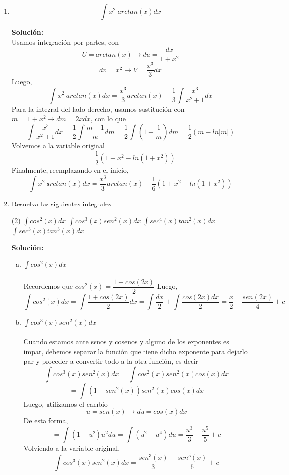 \documentclass[12pt]{article}
\newenvironment{solucion}
{\begin{mdframed}[backgroundcolor=black!10]
		{\bf Solución:}\\
	}
	{
	\end{mdframed}
}
\newenvironment{preguntas}
{\begin{enumerate}\itemsep12pt
	}
	{
	\end{enumerate}
}
\newcommand{\ev}{\Big|}
\newcommand{\ra}{\rightarrow}
\begin{document}
\begin{preguntas}
\begin{solucion}
		Luego, el área de cada sección será
		$$A = \pi r_1^2 + \pi r_2^2 = \pi(x^2+x^4) $$
		Asi,
		$$dV = \pi(x^2+x^4)dx$$
		Finalmente, el volumen del sólido es
		$$V = \int_0^1 \pi(x^2+x^4)dx = \pi\left(\dfrac{x^3}{3} + \dfrac{x^5}{5}\right)\ev_0^1 = \pi \left(\dfrac{1}{3}+\dfrac{1}{5}\right) = \dfrac{8\pi}{15}$$
\end{solucion}
\item $$\displaystyle\int x^2\ arctan(x)dx$$
\begin{solucion}
Usamos integración por partes, con
		$$U = arctan(x) \ra du = \dfrac{dx}{1+x^2}$$
		$$dv = x^2 \ra V = \dfrac{x^3}{3}dx$$
		Luego,
		$$\displaystyle\int x^2\ arctan(x)dx = \dfrac{x^3}{3}arctan(x) - \dfrac{1}{3} \displaystyle\int \dfrac{x^3}{x^2+1}dx$$
		Para la integral del lado derecho, usamos sustitución con $m = 1+x^2 \ra dm = 2xdx$, con lo que
		$$\displaystyle\int \dfrac{x^3}{x^2+1}dx
		= \dfrac{1}{2}\displaystyle\int \dfrac{m-1}{m}dm
		= \dfrac{1}{2}\displaystyle\int \left(1-\dfrac{1}{m}\right)dm = \dfrac{1}{2}(m-ln|m|)$$
		Volvemos a la variable original
		$$= \dfrac{1}{2}(1+x^2-ln(1+x^2))$$
		Finalmente, reemplazando en el inicio,
		$$\displaystyle\int x^2\ arctan(x)dx = \dfrac{x^3}{3}arctan(x) - \dfrac{1}{6} (1+x^2-ln(1+x^2))$$
\end{solucion}
\item Resuelva las siguientes integrales
\begin{tasks}(2)
\task $\displaystyle\int cos^2(x)dx$
\task $\displaystyle\int cos^3(x)sen^2(x)dx$
\task $\displaystyle\int sec^4(x)tan^2(x)dx$
\task $\displaystyle\int sec^3(x)tan^3(x)dx$
\end{tasks}
\begin{solucion}

\begin{enumerate}[a)]
\item $\displaystyle\int cos^2(x)dx$\\\\
			Recordemos que $cos^2(x) = \dfrac{1+cos(2x)}{2}$
			Luego,
			$$\displaystyle\int cos^2(x)dx 
			= \displaystyle\int \dfrac{1+cos(2x)}{2}dx
			= \displaystyle\int \dfrac{dx}{2} + \displaystyle\int \dfrac{cos(2x)dx}{2}
			= \dfrac{x}{2} + \dfrac{sen(2x)}{4} + c
			$$
\item $\displaystyle\int cos^3(x)sen^2(x)dx$\\\\
			Cuando estamos ante senos y cosenos y alguno de los exponentes es impar, debemos separar la función que tiene dicho exponente para dejarlo par y proceder a convertir todo a la otra función, es decir
			$$\displaystyle\int cos^3(x)sen^2(x)dx
			= \displaystyle\int cos^2(x)sen^2(x)cos(x)dx$$
			$$= \displaystyle\int (1-sen^2(x))sen^2(x)cos(x)dx$$
			Luego, utilizamos el cambio
			$$u = sen(x) \ra du = cos(x)dx$$
			De esta forma,
			$$= \displaystyle\int (1-u^2)u^2du
			= \displaystyle\int (u^2-u^4)du
			= \dfrac{u^3}{3} - \dfrac{u^5}{5} + c
			$$
			Volviendo a la variable original,
			$$\displaystyle\int cos^3(x)sen^2(x)dx 
			= \dfrac{sen^3(x)}{3} - \dfrac{sen^5(x)}{5} + c$$
			

\end{enumerate}
\end{solucion}
\end{preguntas}
\end{document}
